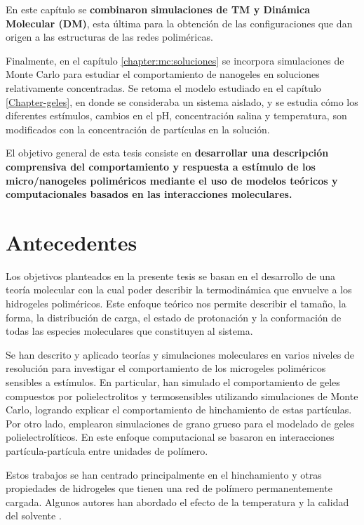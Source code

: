 En este cap\'itulo se \textbf{combinaron simulaciones de TM y Din\'amica Molecular (DM)}, esta \'ultima para la obtenci\'on de las configuraciones que dan origen a las estructuras de las redes polim\'ericas.

Finalmente, en el cap\'itulo \ref{chapter:mc:soluciones} se incorpora simulaciones de Monte Carlo para estudiar el comportamiento de nanogeles en soluciones relativamente concentradas. Se retoma el modelo estudiado en el cap\'itulo \ref{Chapter-geles}, en donde se consideraba un sistema aislado, y se estudia c\'omo los diferentes est\'imulos, cambios en el pH, concentraci\'on salina y temperatura, son modificados con la concentraci\'on de part\'iculas en la soluci\'on.

El objetivo general de esta tesis consiste en \textbf{desarrollar una descripci\'on comprensiva del comportamiento y respuesta a est\'imulo de los micro/nanogeles polim\'ericos mediante el uso de modelos te\'oricos y computacionales basados en las interacciones moleculares.}


\section{Antecedentes}

Los objetivos planteados en la presente tesis se basan en el desarrollo de una teor\'ia molecular con la cual poder describir la termodin\'amica que envuelve a los hidrogeles polim\'ericos.
Este enfoque te\'orico nos permite describir el tama\~no, la forma, la distribuci\'on de carga, el estado de protonaci\'on y la conformaci\'on de todas las especies moleculares que constituyen al sistema.

Se han descrito y aplicado teor\'ias y simulaciones moleculares en varios niveles de resoluci\'on para investigar el comportamiento de los microgeles polim\'ericos sensibles a est\'imulos.
En particular, \citet{quesada2011gel} han simulado el comportamiento de geles compuestos por polielectrolitos y termosensibles utilizando simulaciones de Monte Carlo, logrando explicar el comportamiento de hinchamiento de estas part\'iculas. Por otro lado, \citet{ahualli2016coarse} emplearon simulaciones de grano grueso para el modelado de geles polielectrol\'iticos. En este enfoque computacional se basaron en interacciones part\'icula-part\'icula entre unidades de pol\'imero.

Estos trabajos se han centrado principalmente en el hinchamiento y otras propiedades de hidrogeles que tienen una red de pol\'imero permanentemente cargada. Algunos autores han abordado el efecto de la temperatura y la calidad del solvente \cite{Jha2011, QuesadaPerez2013, moncho-jorda2016a, ahualli2016coarse, AdroherBenitez2017PCCP}.

